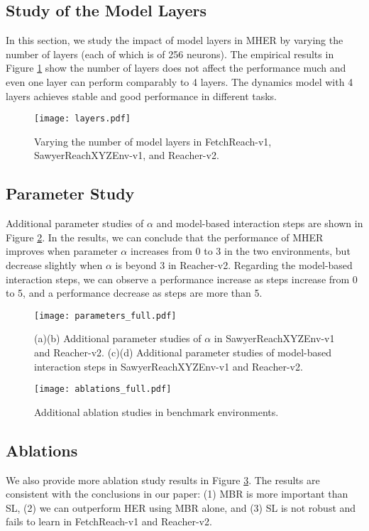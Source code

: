 \documentclass{article}
\begin{document}
\subsection{Study of the Model Layers}
In this section, we study the impact of model layers in MHER by varying the number of layers (each of which is of 256 neurons). The empirical results in Figure \ref{fig:layers}  show the number of layers does not affect the performance much and even one layer can perform comparably to 4 layers. The dynamics model with 4 layers achieves stable and good performance in different tasks.

\begin{figure}[htb]
    \centering
    \texttt{[image: layers.pdf]}
    \caption{Varying the number of model layers in FetchReach-v1, SawyerReachXYZEnv-v1, and Reacher-v2.}
    \label{fig:layers}
\end{figure}

\subsection{Parameter Study}
Additional parameter studies of $\alpha$ and model-based interaction steps are shown in Figure \ref{fig:parameters_full}. In the results, we can conclude that the performance of MHER improves when parameter $\alpha$ increases from 0 to 3 in the two environments, but decrease slightly when $\alpha$ is beyond 3 in Reacher-v2. Regarding the model-based interaction steps, we can observe a performance increase as steps increase from 0 to 5, and a performance decrease as steps are more than 5.
\begin{figure}[htb]
    \centering
    \texttt{[image: parameters\_full.pdf]}
    \caption{(a)(b) Additional parameter studies of $\alpha$ in SawyerReachXYZEnv-v1 and Reacher-v2. (c)(d) Additional parameter studies of model-based interaction steps in SawyerReachXYZEnv-v1 and Reacher-v2.}
    \label{fig:parameters_full}
\end{figure}

\begin{figure}[htb]
    \centering
    \texttt{[image: ablations\_full.pdf]}
    \caption{Additional ablation studies in benchmark environments.}
    \label{fig:ablations_full}
\end{figure}

\subsection{Ablations}
We also provide more ablation study results in Figure \ref{fig:ablations_full}. The results are consistent with the conclusions in our paper: (1) MBR is more important than SL, (2) we can outperform HER using MBR alone, and (3) SL is not robust and fails to learn in FetchReach-v1 and Reacher-v2.
\end{document}

